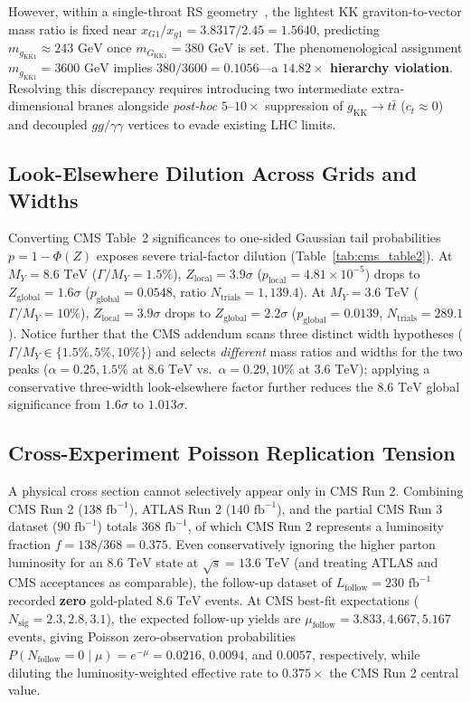 \documentclass[11pt,a4paper]{article}
\begin{document}
However, within a single-throat RS geometry~\cite{randall1999}, the lightest KK graviton-to-vector mass ratio is fixed near $x_{G1}/x_{g1} = 3.8317 / 2.45 = 1.5640$, predicting $m_{g_{\mathrm{KK}1}} \approx 243\text{ GeV}$ once $m_{G_{\mathrm{KK}1}} = 380\text{ GeV}$ is set. The phenomenological assignment $m_{g_{\mathrm{KK}1}} = 3600\text{ GeV}$ implies $380/3600 = 0.1056$---a \textbf{$14.82\times$ hierarchy violation}. Resolving this discrepancy requires introducing two intermediate extra-dimensional branes alongside \emph{post-hoc} $5\text{--}10\times$ suppression of $g_{\mathrm{KK}} \to t\bar{t}$ ($c_t \approx 0$) and decoupled $gg/\gamma\gamma$ vertices to evade existing LHC limits.

\subsection{Look-Elsewhere Dilution Across Grids and Widths}
Converting CMS Table~2 significances to one-sided Gaussian tail probabilities $p = 1 - \Phi(Z)$ exposes severe trial-factor dilution (Table~\ref{tab:cms_table2}). At $M_Y = 8.6\text{ TeV}$ ($\Gamma/M_Y = 1.5\%$), $Z_{\mathrm{local}} = 3.9\sigma$ ($p_{\mathrm{local}} = 4.81\times 10^{-5}$) drops to $Z_{\mathrm{global}} = 1.6\sigma$ ($p_{\mathrm{global}} = 0.0548$, ratio $N_{\mathrm{trials}} = 1{,}139.4$). At $M_Y = 3.6\text{ TeV}$ ($\Gamma/M_Y = 10\%$), $Z_{\mathrm{local}} = 3.9\sigma$ drops to $Z_{\mathrm{global}} = 2.2\sigma$ ($p_{\mathrm{global}} = 0.0139$, $N_{\mathrm{trials}} = 289.1$). Notice further that the CMS addendum scans three distinct width hypotheses ($\Gamma/M_Y \in \{1.5\%, 5\%, 10\%\}$) and selects \emph{different} mass ratios and widths for the two peaks ($\alpha = 0.25, 1.5\%$ at $8.6\text{ TeV}$ vs.\ $\alpha = 0.29, 10\%$ at $3.6\text{ TeV}$); applying a conservative three-width look-elsewhere factor further reduces the $8.6\text{ TeV}$ global significance from $1.6\sigma$ to $1.013\sigma$.

\subsection{Cross-Experiment Poisson Replication Tension}
A physical cross section cannot selectively appear only in CMS Run 2. Combining CMS Run 2 ($138\text{ fb}^{-1}$), ATLAS Run 2 ($140\text{ fb}^{-1}$), and the partial CMS Run 3 dataset ($90\text{ fb}^{-1}$) totals $368\text{ fb}^{-1}$, of which CMS Run 2 represents a luminosity fraction $f = 138/368 = 0.375$. Even conservatively ignoring the higher parton luminosity for an $8.6\text{ TeV}$ state at $\sqrt{s} = 13.6\text{ TeV}$ (and treating ATLAS and CMS acceptances as comparable), the follow-up dataset of $L_{\mathrm{follow}} = 230\text{ fb}^{-1}$ recorded \textbf{zero} gold-plated $8.6\text{ TeV}$ events. At CMS best-fit expectations ($N_{\mathrm{sig}} = 2.3, 2.8, 3.1$), the expected follow-up yields are $\mu_{\mathrm{follow}} = 3.833, 4.667, 5.167$ events, giving Poisson zero-observation probabilities $P(N_{\mathrm{follow}}=0 \mid \mu) = e^{-\mu} = 0.0216$, $0.0094$, and $0.0057$, respectively, while diluting the luminosity-weighted effective rate to $0.375\times$ the CMS Run 2 central value.
\end{document}
